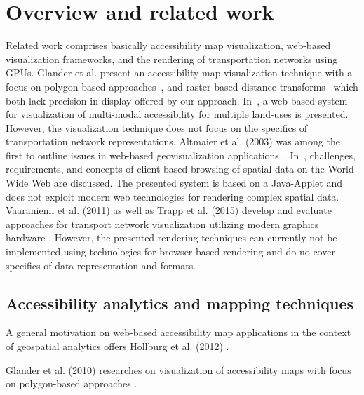 
\cleardoublepage              %
\chapter{Overview and related work}
  Related work comprises basically accessibility map visualization, web-based
  visualization frameworks, and the rendering of transportation networks using
  GPUs. Glander et al. present an accessibility map visualization technique
  with a focus on polygon-based approaches~\cite{Glander2010}, and raster-based
  distance transforms~\cite{Mueller2010} which both lack precision in display
  offered by our approach. In~\cite{Yin2015}, a web-based system for visualization
  of multi-modal accessibility for multiple
  land-uses is presented. However, the visualization technique does not focus on the
  specifics of transportation network representations. Altmaier et al. (2003) was
  among the first to outline issues in web-based geovisualization
  applications~\cite{Altmaier2003}. In~\cite{Brabec2007}, challenges, requirements,
  and concepts of client-based browsing of spatial data on the World Wide Web are
  discussed. The presented system is based on a Java-Applet and does not exploit
  modern web technologies for rendering complex spatial data. Vaaraniemi et al. (2011)
  as well as Trapp et al. (2015) develop and evaluate approaches for transport network
  visualization utilizing modern graphics hardware \cite{Vaaraniemi2011,Trapp2015}.
  However, the presented rendering techniques can currently not be implemented
  using technologies for browser-based rendering and do no cover specifics of
  data representation and formats.\par
  \section{Accessibility analytics and mapping techniques}
    A general motivation on web-based accessibility map applications in the context of geospatial analytics offers Hollburg et al. (2012) \cite{hollburghier}.\par
    Glander et al. (2010) researches on visualization of accessibility maps with focus on polygon-based approaches \cite{Glander2010}.\par
